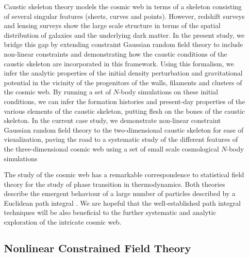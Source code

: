 \documentclass[a4paper, 11pt]{article}
\begin{document}
Caustic skeleton theory models the cosmic web in terms of a skeleton
consisting of several singular features (sheets, curves and points).
However, redshift surveys and lensing surveys show the large scale
structure in terms of the spatial distribution of galaxies and the
underlying dark matter. In the present study, we bridge this gap by
extending constraint Gaussian random field theory to include non-linear
constraints and demonstrating how the caustic conditions of the caustic
skeleton are incorporated in this framework. Using this formalism, we
infer the analytic properties of the initial density perturbation and
gravitational potential in the vicinity of the progenitors of the walls,
filaments and clusters of the cosmic web. By running a set of $N$-body
simulations on these initial conditions, we can infer the formation
histories and present-day properties of the various elements of the
caustic skeleton, putting flesh on the bones of the caustic skeleton. In
the current case study, we demonstrate non-linear constraint Gaussian
random field theory to the two-dimensional caustic skeleton for ease of
visualization, paving the road to a systematic study of the different
features of the three-dimensional cosmic web using a set of small scale
cosmological $N$-body simulations

The study of the cosmic web has a remarkable correspondence to
statistical field theory for the study of phase transition in
thermodynamics. Both theories describe the emergent behaviour of a large
number of particles described by a Euclidean path integral
\cite{Feynman:1965}. We are hopeful that the well-established path
integral techniques will be also beneficial to the further systematic
and analytic exploration of the intricate cosmic web.


\subsection{Nonlinear Constrained Field Theory}
\end{document}

